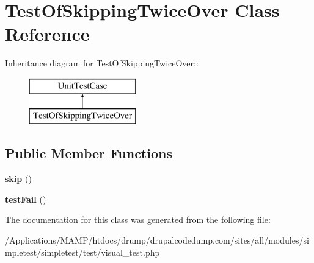 \hypertarget{class_test_of_skipping_twice_over}{
\section{TestOfSkippingTwiceOver Class Reference}
\label{class_test_of_skipping_twice_over}
}
Inheritance diagram for TestOfSkippingTwiceOver::\begin{figure}[H]
\begin{center}
\leavevmode
\includegraphics[height=2cm]{class_test_of_skipping_twice_over}
\end{center}
\end{figure}
\subsection*{Public Member Functions}
\begin{DoxyCompactItemize}
\item 
\hypertarget{class_test_of_skipping_twice_over_a124c18fae986a2cb03b68b98381fdf9f}{
{\bfseries skip} ()}
\label{class_test_of_skipping_twice_over_a124c18fae986a2cb03b68b98381fdf9f}

\item 
\hypertarget{class_test_of_skipping_twice_over_aadc100afea897799e016a454f88c0a24}{
{\bfseries testFail} ()}
\label{class_test_of_skipping_twice_over_aadc100afea897799e016a454f88c0a24}

\end{DoxyCompactItemize}


The documentation for this class was generated from the following file:\begin{DoxyCompactItemize}
\item 
/Applications/MAMP/htdocs/drump/drupalcodedump.com/sites/all/modules/simpletest/simpletest/test/visual\_\-test.php\end{DoxyCompactItemize}
